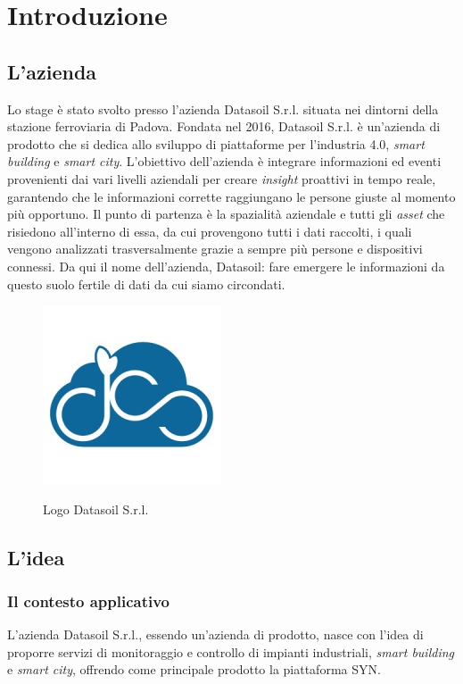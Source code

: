 \chapter{Introduzione}
\label{chap:introduzione}

\section{L'azienda}
Lo stage è stato svolto presso l'azienda Datasoil S.r.l. situata nei dintorni della stazione ferroviaria di Padova.
Fondata nel 2016, Datasoil S.r.l. è un'azienda di prodotto che si dedica allo sviluppo di piattaforme per l'industria 4.0,
\textit{smart building} e \textit{smart city}.
L'obiettivo dell'azienda è integrare informazioni ed eventi provenienti dai vari livelli aziendali per creare \textit{insight} proattivi
in tempo reale, garantendo che le informazioni corrette raggiungano le persone giuste al momento più opportuno.
Il punto di partenza è la spazialità aziendale e tutti gli \textit{asset} che risiedono all'interno di essa, da cui
provengono tutti i dati raccolti, i quali vengono analizzati trasversalmente grazie a sempre più persone e dispositivi connessi.
Da qui il nome dell'azienda, Datasoil: fare emergere le informazioni da questo suolo fertile di dati da cui siamo circondati.

\begin{figure}[H]
      \centering
      \includegraphics[alt={Logo Datasoil S.r.l.}, width=0.25\columnwidth]{img/datasoil_logo.jpg}
      \caption{Logo Datasoil S.r.l.}
      \label{fig:datasoil}
\end{figure}

\section{L'idea}
\subsection{Il contesto applicativo}
L'azienda Datasoil S.r.l., essendo un'azienda di prodotto, nasce con l'idea di proporre servizi di monitoraggio e controllo
di impianti industriali, \textit{smart building} e \textit{smart city}, offrendo come principale prodotto la piattaforma SYN.

